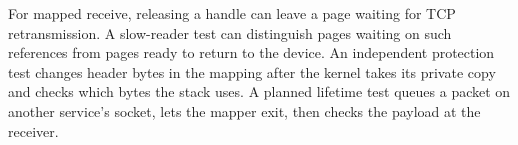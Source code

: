 For mapped receive, releasing a handle can leave a page waiting for TCP
retransmission. A slow-reader test can distinguish pages waiting on such
references from pages ready to return to the device. An independent protection
test changes header bytes in the mapping after the kernel takes its private
copy and checks which bytes the stack uses. A planned lifetime test queues a
packet on another service's socket, lets the mapper exit, then checks the
payload at the receiver.
